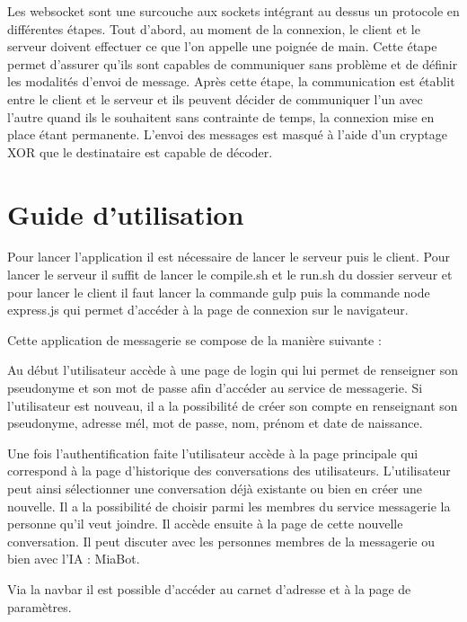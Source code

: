 \par Les websocket sont une surcouche aux sockets intégrant au dessus un protocole en différentes étapes.
Tout d'abord, au moment de la connexion, le client et le serveur doivent effectuer ce que l'on appelle une poignée de main.
Cette étape permet d'assurer qu'ils sont capables de communiquer sans problème et de définir les modalités d'envoi de message.
Après cette étape, la communication est établit entre le client et le serveur et ils peuvent décider de communiquer l'un avec l'autre 
quand ils le souhaitent sans contrainte de temps, la connexion mise en place étant permanente. 
L'envoi des messages est masqué à l'aide d'un cryptage XOR que le destinataire est capable de décoder.

\section{Guide d'utilisation}

\par Pour lancer l'application il est nécessaire de lancer le serveur puis le client. Pour lancer le serveur il suffit de lancer le compile.sh et le run.sh du dossier serveur et pour lancer le client il faut lancer la commande gulp puis la commande node express.js qui permet d'accéder à la page de connexion sur le navigateur. \\


\par Cette application de messagerie se compose de la manière suivante : \\

\par Au début l'utilisateur accède à une page de login qui lui permet de renseigner son pseudonyme et son mot de passe afin d'accéder au service de messagerie. Si l'utilisateur est nouveau, il a la possibilité de créer son compte en renseignant son pseudonyme, adresse mél, mot de passe, nom, prénom et date de naissance. 
\par Une fois l'authentification faite l'utilisateur accède à la page principale qui correspond à la page d'historique des conversations des utilisateurs. L'utilisateur peut ainsi sélectionner une conversation déjà existante ou bien en créer une nouvelle. Il a la possibilité de choisir parmi les membres du service messagerie la personne qu'il veut joindre. Il accède ensuite à la page de cette nouvelle conversation. Il peut discuter avec les personnes membres de la messagerie ou bien avec l'IA : MiaBot.
\par Via la navbar il est possible d'accéder au carnet d'adresse et à la page de paramètres. \\

